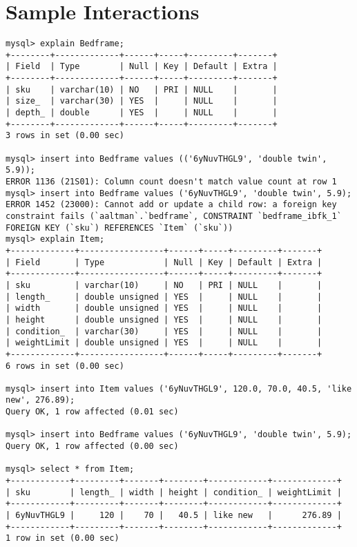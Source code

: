 \documentclass[american,extrafontsizes,12pt,portrait,letterpaper,oneside,onecolumn,article,final]{memoir}
\begin{document}
\section*{Sample Interactions}
%

\begin{verbatim}
mysql> explain Bedframe;
+--------+-------------+------+-----+---------+-------+
| Field  | Type        | Null | Key | Default | Extra |
+--------+-------------+------+-----+---------+-------+
| sku    | varchar(10) | NO   | PRI | NULL    |       |
| size_  | varchar(30) | YES  |     | NULL    |       |
| depth_ | double      | YES  |     | NULL    |       |
+--------+-------------+------+-----+---------+-------+
3 rows in set (0.00 sec)

mysql> insert into Bedframe values (('6yNuvTHGL9', 'double twin', 5.9));
ERROR 1136 (21S01): Column count doesn't match value count at row 1
mysql> insert into Bedframe values ('6yNuvTHGL9', 'double twin', 5.9);
ERROR 1452 (23000): Cannot add or update a child row: a foreign key constraint fails (`aaltman`.`bedframe`, CONSTRAINT `bedframe_ibfk_1` FOREIGN KEY (`sku`) REFERENCES `Item` (`sku`))
mysql> explain Item;
+-------------+-----------------+------+-----+---------+-------+
| Field       | Type            | Null | Key | Default | Extra |
+-------------+-----------------+------+-----+---------+-------+
| sku         | varchar(10)     | NO   | PRI | NULL    |       |
| length_     | double unsigned | YES  |     | NULL    |       |
| width       | double unsigned | YES  |     | NULL    |       |
| height      | double unsigned | YES  |     | NULL    |       |
| condition_  | varchar(30)     | YES  |     | NULL    |       |
| weightLimit | double unsigned | YES  |     | NULL    |       |
+-------------+-----------------+------+-----+---------+-------+
6 rows in set (0.00 sec)

mysql> insert into Item values ('6yNuvTHGL9', 120.0, 70.0, 40.5, 'like new', 276.89);
Query OK, 1 row affected (0.01 sec)

mysql> insert into Bedframe values ('6yNuvTHGL9', 'double twin', 5.9);
Query OK, 1 row affected (0.00 sec)

mysql> select * from Item;
+------------+---------+-------+--------+------------+-------------+
| sku        | length_ | width | height | condition_ | weightLimit |
+------------+---------+-------+--------+------------+-------------+
| 6yNuvTHGL9 |     120 |    70 |   40.5 | like new   |      276.89 |
+------------+---------+-------+--------+------------+-------------+
1 row in set (0.00 sec)


\end{verbatim}
\end{document}
